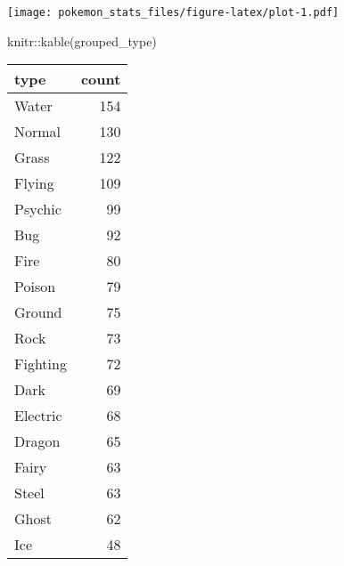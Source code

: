 \documentclass[
]{article}
\newenvironment{Shaded}{\begin{snugshade}}{\end{snugshade}}
\newcommand{\FunctionTok}[1]{\textcolor[rgb]{0.00,0.00,0.00}{#1}}
\newcommand{\NormalTok}[1]{#1}
\newcommand{\SpecialCharTok}[1]{\textcolor[rgb]{0.00,0.00,0.00}{#1}}
\begin{document}
\texttt{[image: pokemon\_stats\_files/figure-latex/plot-1.pdf]}

\begin{Shaded}
\begin{Highlighting}[]
\NormalTok{knitr}\SpecialCharTok{::}\FunctionTok{kable}\NormalTok{(grouped\_type)}
\end{Highlighting}
\end{Shaded}

\begin{longtable}[]{@{}lr@{}}
\toprule()
type & count \\
\midrule()
\endhead
Water & 154 \\
Normal & 130 \\
Grass & 122 \\
Flying & 109 \\
Psychic & 99 \\
Bug & 92 \\
Fire & 80 \\
Poison & 79 \\
Ground & 75 \\
Rock & 73 \\
Fighting & 72 \\
Dark & 69 \\
Electric & 68 \\
Dragon & 65 \\
Fairy & 63 \\
Steel & 63 \\
Ghost & 62 \\
Ice & 48 \\
\bottomrule()
\end{longtable}
\end{document}
